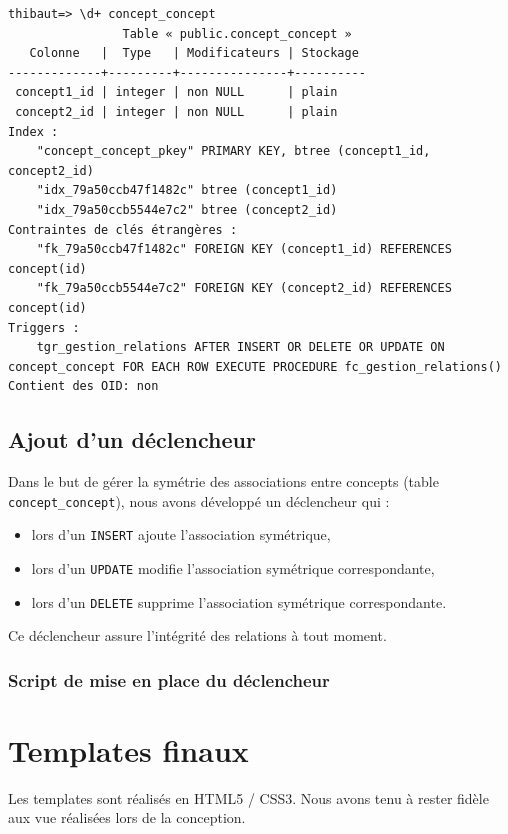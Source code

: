 \begin{verbatim}
thibaut=> \d+ concept_concept
                Table « public.concept_concept »
   Colonne   |  Type   | Modificateurs | Stockage 
-------------+---------+---------------+----------
 concept1_id | integer | non NULL      | plain     
 concept2_id | integer | non NULL      | plain     
Index :
    "concept_concept_pkey" PRIMARY KEY, btree (concept1_id, concept2_id)
    "idx_79a50ccb47f1482c" btree (concept1_id)
    "idx_79a50ccb5544e7c2" btree (concept2_id)
Contraintes de clés étrangères :
    "fk_79a50ccb47f1482c" FOREIGN KEY (concept1_id) REFERENCES concept(id)
    "fk_79a50ccb5544e7c2" FOREIGN KEY (concept2_id) REFERENCES concept(id)
Triggers :
    tgr_gestion_relations AFTER INSERT OR DELETE OR UPDATE ON concept_concept FOR EACH ROW EXECUTE PROCEDURE fc_gestion_relations()
Contient des OID: non

\end{verbatim}

\subsection{Ajout d'un déclencheur}

Dans le but de gérer la symétrie des associations entre concepts (table \texttt{concept\_concept}), nous avons développé un déclencheur qui :
\begin{itemize}
\item lors d'un \texttt{INSERT} ajoute l'association symétrique,
\item lors d'un \texttt{UPDATE} modifie l'association symétrique correspondante,
\item lors d'un \texttt{DELETE} supprime l'association symétrique correspondante.
\end{itemize}

Ce déclencheur assure l'intégrité des relations à tout moment.

\subsubsection{Script de mise en place du déclencheur}


\section{Templates finaux}

Les templates sont réalisés en HTML5 / CSS3. Nous avons tenu à rester fidèle aux vue réalisées lors de la conception.

